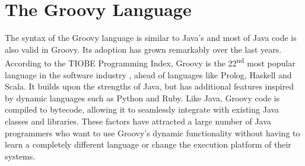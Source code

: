 \documentclass[preprint]{sigplanconf}
\begin{document}
%
%

\section{The Groovy Language\label{groovy}}
The syntax of the Groovy language is similar to Java's and most of Java code is also valid in Groovy.
Its adoption has grown remarkably over the last years.
According to the TIOBE Programming Index, Groovy is the 22\textsuperscript{nd} most popular language in the software industry \cite{tiobe}, ahead of languages like Prolog, Haskell and Scala. 
It builds upon the strengths of Java, but has additional features inspired by dynamic languages such as Python and Ruby.
Like Java, Groovy code is compiled to bytecode, allowing it to seamlessly integrate with existing Java classes and libraries. 
These factors have attracted a large number of Java programmers who want to use Groovy's dynamic functionality without having to learn a completely different language or change the execution platform of their systems. 

\end{document}
